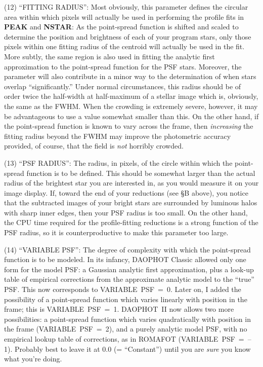 \item{(12)}  ``FITTING RADIUS'':  Most obviously, this parameter
defines the circular area within which pixels will actually be used in
performing the profile fits in {\bf PEAK} and {\bf NSTAR}:  As the
point-spread function is shifted and scaled to determine the position
and brightness of each of your program stars, only those pixels within
one fitting radius of the centroid will actually be used in the fit.
More subtly, the same region is also used in fitting the analytic first
approximation to the point-spread function for the PSF stars. Moreover,
the parameter will also contribute in a minor way to the determination
of when stars overlap ``significantly.''  Under normal circumstances,
this radius should be of order twice the half-width at half-maximum of
a stellar image which is, obviously, the same as the FWHM.  When the
crowding is extremely severe, however, it may be advantageous to use a
value somewhat smaller than this.  On the other hand, if the
point-spread function is known to vary across the frame, then {\it
increasing} the fitting radius beyond the FWHM may improve the
photometric accuracy provided, of course, that the field is {\it not\/}
horribly crowded.

\item{(13)} ``PSF RADIUS'':  The radius, in pixels, of the circle
within which the point-spread function is to be defined.  This should
be somewhat larger than the actual radius of the brightest star you are
interested in, as you would measure it on your image display.  If,
toward the end of your reductions (see \S B above), you notice that the
subtracted images of your bright stars are surrounded by luminous halos
with sharp inner edges, then your PSF radius is too small. On the other
hand, the CPU time required for the profile-fitting reductions is a
strong function of the PSF radius, so it is counterproductive to make
this parameter too large.

\item{(14)} ``VARIABLE PSF'':  The degree of complexity with which the
point-spread function is to be modeled.  In its infancy, DAOPHOT
Classic allowed only one form for the model PSF:  a Gaussian analytic
first approximation, plus a look-up table of empirical corrections from
the approximate analytic model to the ``true'' PSF.  This now
corresponds to VARIABLE~PSF~=~0.  Later on, I added the possibility of
a point-spread function which varies linearly with position in the
frame; this is VARIABLE~PSF~=~1.  DAOPHOT~II now allows two more
possibilities:  a point-spread function which varies quadratically with
position in the frame (VARIABLE~PSF~=~2), and a purely analytic model
PSF, with no empirical lookup table of corrections, as in ROMAFOT
(VARIABLE~PSF~=~--1).  Probably best to leave it at 0.0 (=
``Constant'') until you are {\it sure\/} you know what you're doing.

